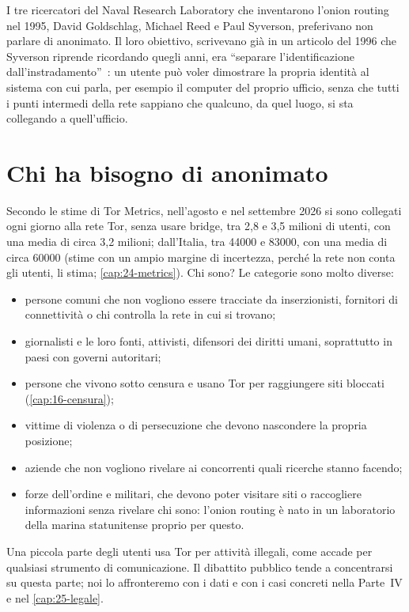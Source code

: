 \begin{storia}
I tre ricercatori del Naval Research Laboratory che inventarono l'onion routing nel 1995, David Goldschlag, Michael Reed e Paul Syverson, preferivano non parlare di anonimato. Il loro obiettivo, scrivevano già in un articolo del 1996 che Syverson riprende ricordando quegli anni, era \enquote{separare l'identificazione dall'instradamento}~\cite{syverson2011peel}: un utente può voler dimostrare la propria identità al sistema con cui parla, per esempio il computer del proprio ufficio, senza che tutti i punti intermedi della rete sappiano che qualcuno, da quel luogo, si sta collegando a quell'ufficio.
\end{storia}

\section{Chi ha bisogno di anonimato}\label{sec:anon-utenti}

Secondo le stime di Tor Metrics, nell'agosto e nel settembre 2026 si sono collegati ogni giorno alla rete Tor, senza usare bridge, tra 2,8 e 3,5 milioni di utenti, con una media di circa 3,2 milioni; dall'Italia, tra \num{44000} e \num{83000}, con una media di circa \num{60000} (stime con un ampio margine di incertezza, perché la rete non conta gli utenti, li stima; \cref{cap:24-metrics}). Chi sono? Le categorie sono molto diverse:
\begin{itemize}
  \item persone comuni che non vogliono essere tracciate da inserzionisti, fornitori di connettività o chi controlla la rete in cui si trovano;
  \item giornalisti e le loro fonti, attivisti, difensori dei diritti umani, soprattutto in paesi con governi autoritari;
  \item persone che vivono sotto censura e usano Tor per raggiungere siti bloccati (\cref{cap:16-censura});
  \item vittime di violenza o di persecuzione che devono nascondere la propria posizione;
  \item aziende che non vogliono rivelare ai concorrenti quali ricerche stanno facendo;
  \item forze dell'ordine e militari, che devono poter visitare siti o raccogliere informazioni senza rivelare chi sono: l'onion routing è nato in un laboratorio della marina statunitense proprio per questo.
\end{itemize}
Una piccola parte degli utenti usa Tor per attività illegali, come accade per qualsiasi strumento di comunicazione. Il dibattito pubblico tende a concentrarsi su questa parte; noi lo affronteremo con i dati e con i casi concreti nella Parte~IV e nel \cref{cap:25-legale}.

